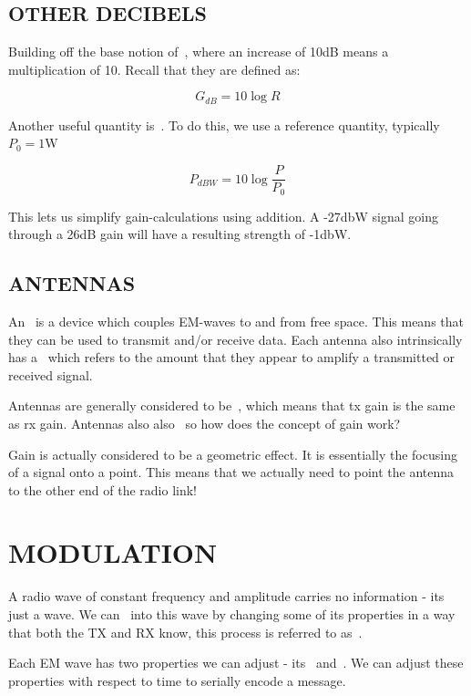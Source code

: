 \documentclass[]{report}
\newcommand{\keyword}[1]{{{\color{green}{#1}\,}}}
\begin{document}
	\section{OTHER DECIBELS}
	
	Building off the base notion of \keyword{decibels}, where an increase of 10dB means a multiplication of 10. Recall that they are defined as:
	\begin{remark}
		\[G_{dB} = 10\log R\]
	\end{remark}
	Another useful quantity is \keyword{decibel-watts (dBW)}. To do this, we use a reference quantity, typically $P_0=1$W
	\begin{remark}
		\[P_{dBW} = 10\log \frac{P}{P_0}\]
	\end{remark}
	This lets us simplify gain-calculations using addition. A -27dbW signal going through a 26dB gain will have a resulting strength of -1dbW.
	
	\section{ANTENNAS}
	
	An \keyword{antenna} is a device which couples EM-waves to and from free space. This means that they can be used to transmit and/or receive data. Each antenna also intrinsically has a \keyword{gain} which refers to the amount that they appear to amplify a transmitted or received signal.
	
	Antennas are generally considered to be \keyword{reciprocal}, which means that tx gain is the same as rx gain. Antennas also also \keyword{passive devices} so how does the concept of gain work?
	
	Gain is actually considered to be a geometric effect. It is essentially the focusing of a signal onto a point. This means that we actually need to point the antenna to the other end of the radio link!
	
	\chapter{MODULATION}
	A radio wave of constant frequency and amplitude carries no information - its just a wave. We can \keyword{encode information} into this wave by changing some of its properties in a way that both the TX and RX know, this process is referred to as \keyword{modulation}.
	
	Each EM wave has two properties we can adjust - its \keyword{amplitude} and \keyword{phase}. We can adjust these properties with respect to time to serially encode a message.
	
\end{document}
